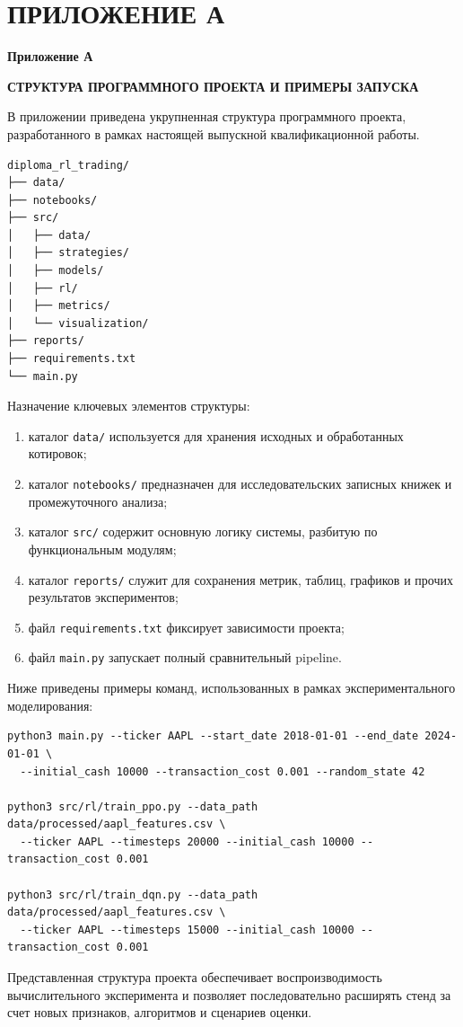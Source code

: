 \clearpage
\section*{ПРИЛОЖЕНИЕ А}

\begin{flushright}
\textbf{Приложение А}
\end{flushright}

\begin{center}
\textbf{СТРУКТУРА ПРОГРАММНОГО ПРОЕКТА И ПРИМЕРЫ ЗАПУСКА}
\end{center}

В приложении приведена укрупненная структура программного проекта, разработанного в рамках настоящей выпускной квалификационной работы.

\begin{verbatim}
diploma_rl_trading/
├── data/
├── notebooks/
├── src/
│   ├── data/
│   ├── strategies/
│   ├── models/
│   ├── rl/
│   ├── metrics/
│   └── visualization/
├── reports/
├── requirements.txt
└── main.py
\end{verbatim}

Назначение ключевых элементов структуры:
\begin{enumerate}[leftmargin=1.25cm,label=\arabic*)]
\item каталог \texttt{data/} используется для хранения исходных и обработанных котировок;
\item каталог \texttt{notebooks/} предназначен для исследовательских записных книжек и промежуточного анализа;
\item каталог \texttt{src/} содержит основную логику системы, разбитую по функциональным модулям;
\item каталог \texttt{reports/} служит для сохранения метрик, таблиц, графиков и прочих результатов экспериментов;
\item файл \texttt{requirements.txt} фиксирует зависимости проекта;
\item файл \texttt{main.py} запускает полный сравнительный pipeline.
\end{enumerate}

Ниже приведены примеры команд, использованных в рамках экспериментального моделирования:

\begin{verbatim}
python3 main.py --ticker AAPL --start_date 2018-01-01 --end_date 2024-01-01 \
  --initial_cash 10000 --transaction_cost 0.001 --random_state 42

python3 src/rl/train_ppo.py --data_path data/processed/aapl_features.csv \
  --ticker AAPL --timesteps 20000 --initial_cash 10000 --transaction_cost 0.001

python3 src/rl/train_dqn.py --data_path data/processed/aapl_features.csv \
  --ticker AAPL --timesteps 15000 --initial_cash 10000 --transaction_cost 0.001
\end{verbatim}

Представленная структура проекта обеспечивает воспроизводимость вычислительного эксперимента и позволяет последовательно расширять стенд за счет новых признаков, алгоритмов и сценариев оценки.

